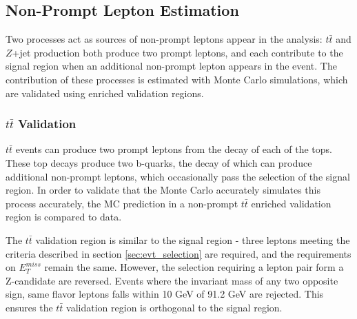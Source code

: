 
\subsection{Non-Prompt Lepton Estimation}
\label{sec:fakes}

Two processes act as sources of non-prompt leptons appear in the analysis: $t\bar{t}$ and $Z$+jet production both produce two prompt leptons, and each contribute to the signal region when an additional non-prompt lepton appears in the event. The contribution of these processes is estimated with Monte Carlo simulations, which are validated using enriched validation regions.

\subsubsection{$t\bar{t}$ Validation}

$t\bar{t}$ events can produce two prompt leptons from the decay of each of the tops. These top decays produce two b-quarks, the decay of which can produce additional non-prompt leptons, which occasionally pass the selection of the signal region. In order to validate that the Monte Carlo accurately simulates this process accurately, the MC prediction in a non-prompt $t\bar{t}$ enriched validation region is compared to data.

The $t\bar{t}$ validation region is similar to the signal region - three leptons meeting the criteria described in section \ref{sec:evt_selection} are required, and the requirements on $E_T^{miss}$ remain the same. However, the selection requiring a lepton pair form a Z-candidate are reversed. Events where the invariant mass of any two opposite sign, same flavor leptons falls within 10 GeV of 91.2 GeV are rejected. This ensures the $t\bar{t}$ validation region is orthogonal to the signal region. 

